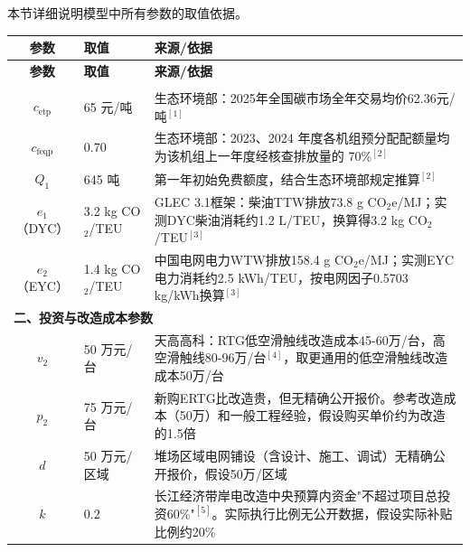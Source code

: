 \documentclass[12pt,a4paper]{article}
\newcommand{\手批注}[2]{\textcolor{#1}{\text{\kaishu #2}}}
\newcommand{\一阶段}{\textcolor{firststage}{\text{\kaishu （一阶段）}}}
\newcommand{\二阶段}{\textcolor{secondstage}{\text{\kaishu （二阶段）}}}
\begin{document}
本节详细说明模型中所有参数的取值依据。

\begin{footnotesize}
\renewcommand{\arraystretch}{1.2}
\begin{longtable}{clp{10cm}}
\toprule
\textbf{参数} & \textbf{取值} & \textbf{来源/依据}\\
\midrule
\endfirsthead
\toprule
\textbf{参数} & \textbf{取值} & \textbf{来源/依据}\\
\midrule
\endhead
\bottomrule
\endfoot

\multicolumn{3}{l}{\textbf{一、碳排放与交易政策参数}} \\
\midrule
$c_{\text{etp}}$ & 65 元/吨 & 生态环境部：2025年全国碳市场全年交易均价62.36元/吨$^{[1]}$\\
$c_{\text{feqp}}$ & 0.70 & 生态环境部：2023、2024 年度各机组预分配配额量均为该机组上一年度经核查排放量的 70\%$^{[2]}$ \\
$Q_1$ & 645 吨 & 第一年初始免费额度，结合生态环境部规定推算$^{[2]}$ \\
$e_1$（DYC） & 3.2 kg CO$_2$/TEU & GLEC 3.1框架：柴油TTW排放73.8 g CO$_2$e/MJ；实测DYC柴油消耗约1.2 L/TEU，换算得3.2 kg CO$_2$/TEU$^{[3]}$  \\
$e_2$（EYC） & 1.4 kg CO$_2$/TEU & 中国电网电力WTW排放158.4 g CO$_2$e/MJ；实测EYC电力消耗约2.5 kWh/TEU，按电网因子0.5703 kg/kWh换算$^{[3]}$ \\

\midrule
\multicolumn{3}{l}{\textbf{二、投资与改造成本参数}} \\
\midrule
$v_2$ & 50 万元/台 & 天高高科：RTG低空滑触线改造成本45-60万/台，高空滑触线80-96万/台$^{[4]}$，取更通用的低空滑触线改造成本50万/台 \\
$p_2$ & 75 万元/台 & 新购ERTG比改造贵，但无精确公开报价。参考改造成本（50万）和一般工程经验，假设购买单价约为改造的1.5倍\\
$d$ & 50 万元/区域 & 堆场区域电网铺设（含设计、施工、调试）无精确公开报价，假设50万/区域 \\
$k$ & 0.2 & 长江经济带岸电改造中央预算内资金"不超过项目总投资60\%"$^{[5]}$。实际执行比例无公开数据，假设实际补贴比例约20\% \\


\end{longtable}
\end{footnotesize}
\end{document}

